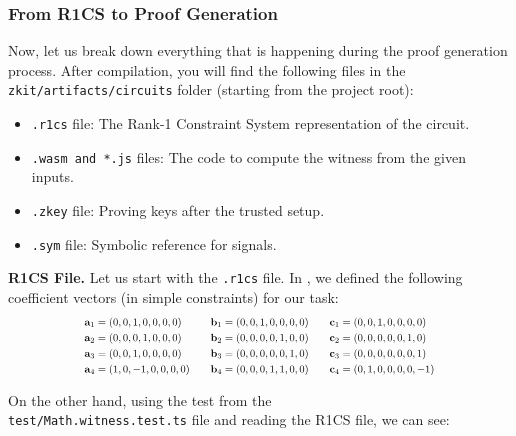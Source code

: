 \documentclass[../lecture-notes.tex]{subfiles}
\begin{document}
    \subsubsection{From R1CS to Proof Generation}

    Now, let us break down everything that is happening during the proof
    generation process. After compilation, you will find the following files in
    the \texttt{zkit/artifacts/circuits} folder (starting from the project
    root):
    \begin{itemize}
        \item \texttt{.r1cs} file: The Rank-1 Constraint System representation of the circuit.
        \item \texttt{.wasm and *.js} files: The code to compute the witness from the given inputs.
        \item \texttt{.zkey} file: Proving keys after the trusted setup.
        \item \texttt{.sym} file: Symbolic reference for signals.
    \end{itemize}

    \textbf{R1CS File.} Let us start with the \texttt{.r1cs} file. In ,
    we defined the following coefficient vectors (in simple constraints) for our
    task:
    \begin{equation*}
        \scalebox{0.75}{$   
        \begin{aligned}
            \mathbf{a}_1 &= (0, 0, 1, 0, 0, 0, 0) & \quad \mathbf{b}_1 &= (0, 0, 1, 0, 0, 0, 0) & \quad \mathbf{c}_1 &= (0, 0, 1, 0, 0, 0, 0) \\
            \mathbf{a}_2 &= (0, 0, 0, 1, 0, 0, 0) & \quad \mathbf{b}_2 &= (0, 0, 0, 0, 1, 0, 0) & \quad \mathbf{c}_2 &= (0, 0, 0, 0, 0, 1, 0) \\
            \mathbf{a}_3 &= (0, 0, 1, 0, 0, 0, 0) & \quad \mathbf{b}_3 &= (0, 0, 0, 0, 0, 1, 0) & \quad \mathbf{c}_3 &= (0, 0, 0, 0, 0, 0, 1) \\
            \mathbf{a}_4 &= (1, 0, -1, 0, 0, 0, 0) & \quad \mathbf{b}_4 &= (0, 0, 0, 1, 1, 0, 0) & \quad \mathbf{c}_4 &= (0, 1, 0, 0, 0, 0, -1)
        \end{aligned}
        $}
    \end{equation*}

    On the other hand, using the test from the \\ \texttt{test/Math.witness.test.ts} file and reading the R1CS file, we can see:
\end{document}
